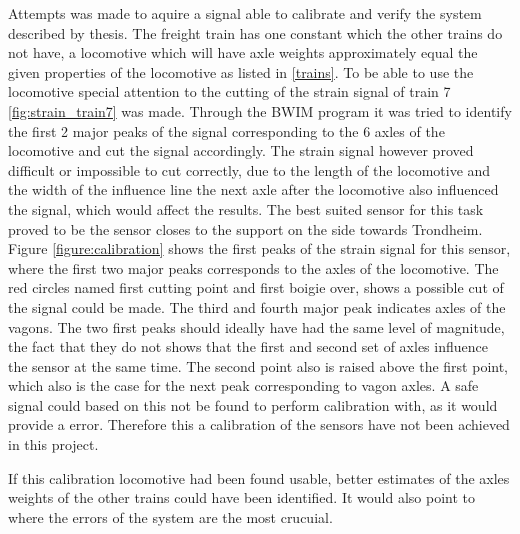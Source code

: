 Attempts was made to aquire a signal able to calibrate and verify the system described by thesis. The freight train has one constant which the other trains do not have, a locomotive which will have axle weights approximately equal the given properties of the locomotive as listed in \ref{trains}. To be able to use the locomotive special attention to the cutting of the strain signal of train 7 \ref{fig:strain_train7} was made. Through the BWIM program it was tried to identify the first 2 major peaks of the signal corresponding to the 6 axles of the locomotive and cut the signal accordingly.
The strain signal however proved difficult or impossible to cut correctly, due to the length of the locomotive and the width of the influence line the next axle after the locomotive also influenced the signal, which would affect the results. The best suited sensor for this task proved to be the sensor closes to the support on the side towards Trondheim. Figure \ref{figure:calibration} shows the first peaks of the strain signal for this sensor, where the first two major peaks corresponds to the axles of the locomotive. The red circles named first cutting point and first boigie over, shows a possible cut of the signal could be made. The third and fourth major peak indicates axles of the vagons. The two first peaks should ideally have had the same level of magnitude, the fact that they do not shows that the first and second set of axles influence the sensor at the same time. The second point also is raised above the first point, which also is the case for the next peak corresponding to vagon axles. A safe signal could based on this not be found to perform calibration with, as it would provide a error. Therefore this a calibration of the sensors have not been achieved in this project.

If this calibration locomotive had been found usable, better estimates of the axles weights of the other trains could have been identified. It would also point to where the errors of the system are the most crucuial.

